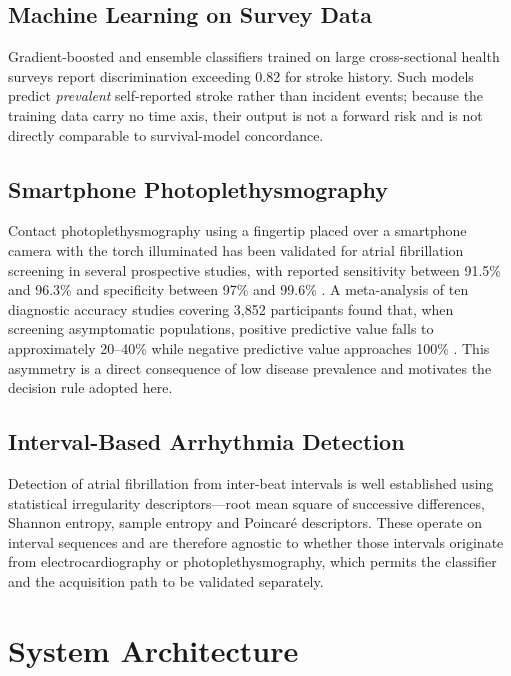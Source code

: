 \documentclass[conference]{IEEEtran}
\begin{document}
\subsection{Machine Learning on Survey Data}
Gradient-boosted and ensemble classifiers trained on large cross-sectional health
surveys report discrimination exceeding 0.82 for stroke history. Such models
predict \emph{prevalent} self-reported stroke rather than incident events; because
the training data carry no time axis, their output is not a forward risk and is
not directly comparable to survival-model concordance.

\subsection{Smartphone Photoplethysmography}
Contact photoplethysmography using a fingertip placed over a smartphone camera
with the torch illuminated has been validated for atrial fibrillation screening in
several prospective studies, with reported sensitivity between 91.5\% and 96.3\%
and specificity between 97\% and 99.6\%
\cite{brasier2019,proesmans2019}. A meta-analysis of ten diagnostic accuracy
studies covering 3{,}852 participants found that, when screening asymptomatic
populations, positive predictive value falls to approximately 20--40\% while
negative predictive value approaches 100\% \cite{oconnor2020}. This asymmetry is
a direct consequence of low disease prevalence and motivates the decision rule
adopted here.

\subsection{Interval-Based Arrhythmia Detection}
Detection of atrial fibrillation from inter-beat intervals is well established
using statistical irregularity descriptors---root mean square of successive
differences, Shannon entropy, sample entropy \cite{richman2000} and Poincar\'e
descriptors. These operate on interval sequences and are therefore agnostic to
whether those intervals originate from electrocardiography or photoplethysmography,
which permits the classifier and the acquisition path to be validated separately.

\section{System Architecture}
\end{document}
